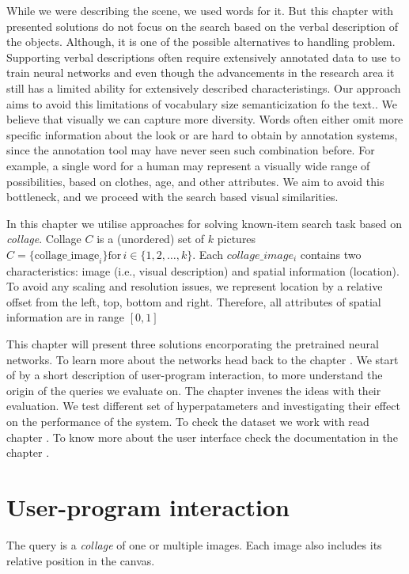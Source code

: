 While we were describing the scene, we used words for it. But this chapter with presented solutions do not focus on the search based on the verbal description of the objects. Although, it is one of the possible alternatives to handling problem. Supporting verbal descriptions often require extensively annotated data to use to train neural networks and even though the advancements in the research area it still has a limited ability for extensively described characteristings. Our approach aims to avoid this limitations of vocabulary size semanticization fo the text.. We believe that visually we can capture more diversity. Words often either omit more specific information about the look or are hard to obtain by annotation systems, since the annotation tool may have never seen such combination before. For example, a single word for a human may represent a visually wide range of possibilities, based on clothes, age, and other attributes. We aim to avoid this bottleneck, and we proceed with the search based visual similarities.


In this chapter we utilise approaches for solving known-item search task based on \emph{collage}. Collage $C$ is a (unordered) set of $k$ pictures $C = \{\text{collage\_image}_i\} \text{for}\, i \in \{1, 2, \dots, k\} $.  Each $collage\_image_i$ contains two characteristics: image (i.e., visual description) and spatial information (location). To avoid any scaling and resolution issues, we represent location by a relative offset from the left, top, bottom and right. Therefore, all attributes of spatial information are in range $[0,1]$

This chapter will present three solutions encorporating the pretrained neural networks. To learn more about the networks head back to the chapter . We start of by a short description of user-program interaction, to more understand the origin of the queries we evaluate on. The chapter invenes the ideas with their evaluation. We test different set of hyperpatameters and investigating their effect on the performance of the system. To check the dataset we work with read chapter . To know more about the user interface check the documentation in the chapter . 


\section{User-program interaction}

The query is a \emph{collage} of one or multiple images. Each image also includes its relative position in the canvas.

